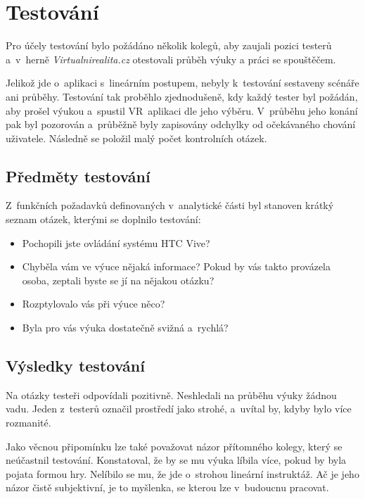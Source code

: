 \chapter{Testování}\label{testovuxe1nuxed}

Pro účely testování bylo požádáno několik kolegů, aby zaujali pozici
testerů a~v~herně \emph{Virtualnirealita.cz} otestovali průběh výuky a
práci se spouštěčem.

Jelikož jde o~aplikaci s~lineárním postupem, nebyly k~testování
sestaveny scénáře ani průběhy. Testování tak proběhlo zjednodušeně, kdy
každý tester byl požádán, aby prošel výukou a~spustil VR~aplikaci dle
jeho výběru. V~průběhu jeho konání pak byl pozorován a~průběžně
byly zapisovány odchylky od očekávaného chování uživatele. Následně se 
položil malý počet kontrolních otázek.

\section{Předměty testování}\label{pux159edmux11bty-testovuxe1nuxed}

Z~funkčních požadavků definovaných v~analytické části byl stanoven
krátký seznam otázek, kterými se doplnilo testování:

\begin{itemize}
  \item
    Pochopili jste ovládání systému HTC Vive?
  \item
    Chyběla vám ve výuce nějaká informace? Pokud by vás takto provázela osoba,
    zeptali byste se jí na nějakou otázku?
  \item
    Rozptylovalo vás při výuce něco?
  \item
    Byla pro vás výuka dostatečně svižná a~rychlá?
\end{itemize}
    
\section{Výsledky testování}\label{vysledky-testovani}

Na otázky testeři odpovídali pozitivně. Neshledali na průběhu výuky
žádnou vadu. Jeden z~testerů označil prostředí jako strohé, a~uvítal by,
kdyby bylo více rozmanité.

Jako věcnou připomínku lze také považovat názor přítomného kolegy, který se
neúčastnil testování. Konstatoval, že by se mu výuka líbila více, pokud by byla
pojata formou hry. Nelíbilo se mu, že jde o~strohou lineární instruktáž. Ač je
jeho názor čistě subjektivní, je to myšlenka, se kterou lze v~budoucnu pracovat.

